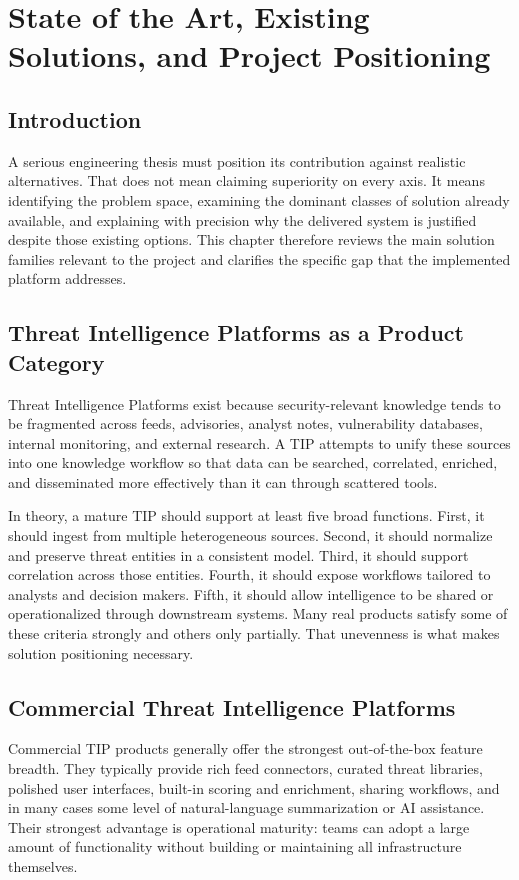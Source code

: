 \chapter{State of the Art, Existing Solutions, and Project Positioning}
\thispagestyle{plain}
\section*{Introduction}
A serious engineering thesis must position its contribution against realistic alternatives. That does not mean claiming superiority on every axis. It means identifying the problem space, examining the dominant classes of solution already available, and explaining with precision why the delivered system is justified despite those existing options. This chapter therefore reviews the main solution families relevant to the project and clarifies the specific gap that the implemented platform addresses.

\section{Threat Intelligence Platforms as a Product Category}
Threat Intelligence Platforms exist because security-relevant knowledge tends to be fragmented across feeds, advisories, analyst notes, vulnerability databases, internal monitoring, and external research. A TIP attempts to unify these sources into one knowledge workflow so that data can be searched, correlated, enriched, and disseminated more effectively than it can through scattered tools.

In theory, a mature TIP should support at least five broad functions. First, it should ingest from multiple heterogeneous sources. Second, it should normalize and preserve threat entities in a consistent model. Third, it should support correlation across those entities. Fourth, it should expose workflows tailored to analysts and decision makers. Fifth, it should allow intelligence to be shared or operationalized through downstream systems. Many real products satisfy some of these criteria strongly and others only partially. That unevenness is what makes solution positioning necessary.

\section{Commercial Threat Intelligence Platforms}
Commercial TIP products generally offer the strongest out-of-the-box feature breadth. They typically provide rich feed connectors, curated threat libraries, polished user interfaces, built-in scoring and enrichment, sharing workflows, and in many cases some level of natural-language summarization or AI assistance. Their strongest advantage is operational maturity: teams can adopt a large amount of functionality without building or maintaining all infrastructure themselves.

